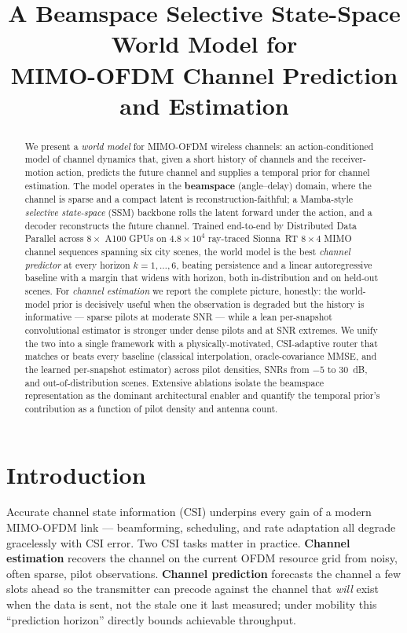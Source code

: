 \documentclass[11pt]{article}
\title{\textbf{A Beamspace Selective State-Space World Model for\\
MIMO-OFDM Channel Prediction and Estimation}}
\author{}
\date{}
\begin{document}
\maketitle

\begin{abstract}
We present a \emph{world model} for MIMO-OFDM wireless channels: an action-conditioned model of
channel dynamics that, given a short history of channels and the receiver-motion action, predicts the
future channel and supplies a temporal prior for channel estimation. The model operates in the
\textbf{beamspace} (angle--delay) domain, where the channel is sparse and a compact latent is
reconstruction-faithful; a Mamba-style \emph{selective state-space} (SSM) backbone rolls the latent
forward under the action, and a decoder reconstructs the future channel. Trained end-to-end by
Distributed Data Parallel across $8\times$ A100 GPUs on $4.8{\times}10^4$ ray-traced Sionna~RT
$8\times4$ MIMO channel sequences spanning six
city scenes, the world model is the best \emph{channel predictor} at every horizon $k{=}1,\dots,6$,
beating persistence and a linear autoregressive baseline with a margin that widens with horizon, both
in-distribution and on held-out scenes. For \emph{channel estimation} we report the complete picture,
honestly: the world-model prior is decisively useful when the observation is degraded but the history
is informative --- sparse pilots at moderate SNR --- while a lean per-snapshot convolutional estimator
is stronger under dense pilots and at SNR extremes. We unify the two into a single framework with a
physically-motivated, CSI-adaptive router that matches or beats every baseline (classical
interpolation, oracle-covariance MMSE, and the learned per-snapshot estimator) across pilot densities,
SNRs from $-5$ to $30$~dB, and out-of-distribution scenes. Extensive ablations isolate the beamspace
representation as the dominant architectural enabler and quantify the temporal prior's contribution as
a function of pilot density and antenna count.
\end{abstract}

\tableofcontents

\section{Introduction}\label{sec:intro}

Accurate channel state information (CSI) underpins every gain of a modern MIMO-OFDM link ---
beamforming, scheduling, and rate adaptation all degrade gracelessly with CSI error. Two CSI tasks
matter in practice. \textbf{Channel estimation} recovers the channel on the current OFDM resource grid
from noisy, often sparse, pilot observations. \textbf{Channel prediction} forecasts the channel a few
slots ahead so the transmitter can precode against the channel that \emph{will} exist when the data is
sent, not the stale one it last measured; under mobility this ``prediction horizon'' directly bounds
achievable throughput.
\end{document}
